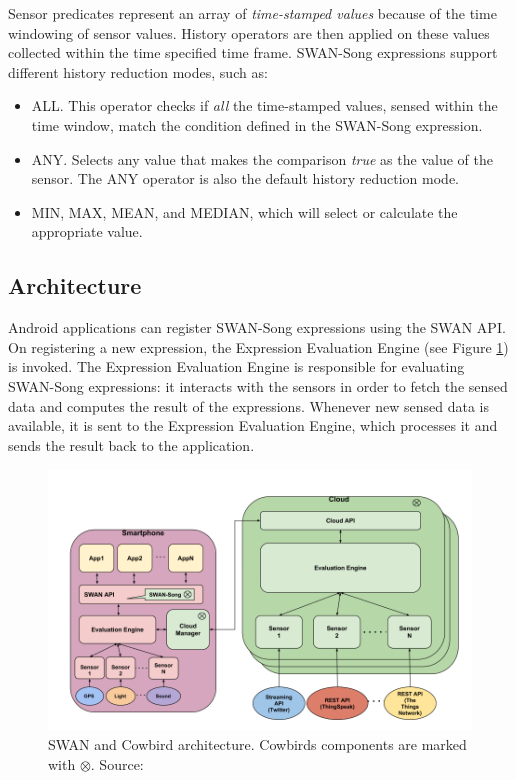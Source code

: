 Sensor predicates represent an array of \emph{time-stamped values} because of the time windowing of sensor values. History operators are then applied on these values collected within the time specified time frame. SWAN-Song expressions support different history reduction modes, such as:
\begin{itemize}
\item ALL. This operator checks if \emph{all} the time-stamped values, sensed within the time window, match the condition defined in the SWAN-Song expression.
\item ANY. Selects any value that makes the comparison \emph{true} as the value of the sensor. The ANY operator is also the default history reduction mode.
\item MIN, MAX, MEAN, and MEDIAN, which will select or calculate the appropriate value.
\end{itemize}

\subsection{Architecture}
Android applications can register SWAN-Song expressions using the SWAN API. On registering a new expression, the Expression Evaluation Engine (see Figure \ref{fig:cowbird_architecture}) is invoked. The Expression Evaluation Engine is responsible for evaluating SWAN-Song expressions: it interacts with the sensors in order to fetch the sensed data and computes the result of the expressions. Whenever new sensed data is available, it is sent to the Expression Evaluation Engine, which processes it and sends the result back to the application.

 \begin{figure}[ht!]
\includegraphics[width=1\textwidth]{images/cowbird_architecture.png}
 \caption{SWAN and Cowbird architecture. Cowbirds components are marked with $\otimes$. Source: \cite{cowbirdarticle}}
\label{fig:cowbird_architecture}
\end{figure}

